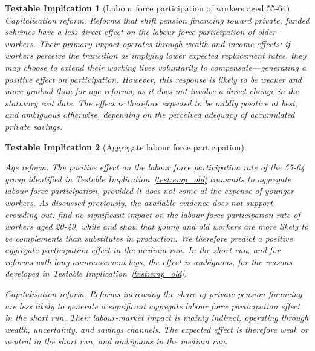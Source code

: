\documentclass[11pt,english,a4paper, twoside, authoryear]{article}
\newtheorem{testable}{Testable Implication}}
\begin{document}
\begin{testable}[Labour force participation of workers aged 55-64]
\textit{Capitalisation reform.} Reforms that shift pension financing toward private, funded schemes have a less direct effect on the labour force participation of older workers. Their primary impact operates through wealth and income effects: if workers perceive the transition as implying lower expected replacement rates, they may choose to extend their working lives voluntarily to compensate---generating a positive effect on participation. However, this response is likely to be weaker and more gradual than for age reforms, as it does not involve a direct change in the statutory exit date. The effect is therefore expected to be mildly positive at best, and ambiguous otherwise, depending on the perceived adequacy of accumulated private savings.
\end{testable}

\begin{testable}[Aggregate labour force participation]\label{test:emp_agg}

\textit{Age reform.} The positive effect on the labour force participation rate of the 55-64 group identified in Testable Implication~\ref{test:emp_old} transmits to aggregate labour force participation, provided it does not come at the expense of younger workers. As discussed previously, the available evidence does not support crowding-out: \citet{BiZubairy2023} find no significant impact on the labour force participation rate of workers aged 20-49, while \citet{MunnellWu2012} and \citet{Dai2022} show that young and old workers are more likely to be complements than substitutes in production. We therefore predict a positive aggregate participation effect in the medium run. In the short run, and for reforms with long announcement lags, the effect is ambiguous, for the reasons developed in Testable Implication~\ref{test:emp_old}.

\textit{Capitalisation reform.} Reforms increasing the share of private pension financing are less likely to generate a significant aggregate labour force participation effect in the short run. Their labour-market impact is mainly indirect, operating through wealth, uncertainty, and savings channels. The expected effect is therefore weak or neutral in the short run, and ambiguous in the medium run.
\end{testable}
\end{document}
